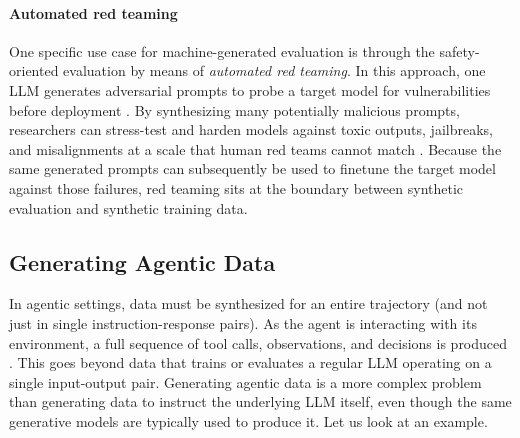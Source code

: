 \paragraph{Automated red teaming}
One specific use case for machine-generated evaluation is through the safety-oriented evaluation by means of  \emph{automated red teaming}. In this approach, one LLM generates adversarial prompts to probe a target model for vulnerabilities before deployment \citep{ganguli2022redteaminglanguagemodels}. By synthesizing many potentially malicious prompts, researchers can stress-test and harden models against toxic outputs, jailbreaks, and misalignments at a scale that human red teams cannot match \citep{perez-etal-2022-red}. Because the same generated prompts can subsequently be used to finetune the target model against those failures, red teaming sits at the boundary between synthetic evaluation and synthetic training data.


\subsection{Generating Agentic Data}
In agentic settings, data must be synthesized for an entire trajectory (and not just in single instruction-response pairs). As the agent is interacting with its environment, a full sequence of tool calls, observations, and decisions is produced \citep{kang2025distilling}. This goes beyond data that trains or evaluates a regular LLM operating on a single input-output pair. Generating agentic data is a more complex problem than generating data to instruct the underlying LLM itself, even though the same generative models are typically used to produce it. Let us look at an example.


